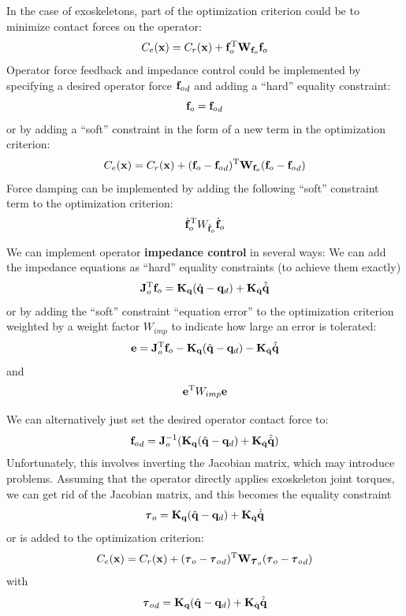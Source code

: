 \documentclass[letterpaper,12pt,fullpage]{article}
\begin{document}
In the case of exoskeletons, 
part of the optimization criterion could be to
minimize contact forces on the operator:
\begin{equation}
C_e({\bf x}) = C_r({\bf x}) + {\bf f}^{{\rm T}}_o {\bf W}_{{\bf f}_o} {\bf f}_o
\end{equation}
Operator force feedback and impedance control could be implemented by specifying a
desired operator force ${{\bf f}_o}_d$ and adding a ``hard'' equality constraint:
\begin{equation}
{\bf f}_o = {{\bf f}_o}_d
\end{equation}
or by adding a ``soft'' constraint in the form of a new term in the optimization
criterion:
\begin{equation}
C_e({\bf x}) = C_r({\bf x}) + ({\bf f}_o - {{\bf f}_o}_d)^{{\rm T}} {\bf W}_{{\bf f}_o} ({\bf f}_o - {{\bf f}_o}_d)
\end{equation}
Force damping can be implemented by adding the following ``soft'' constraint term
to the optimization criterion:
\begin{equation}
\dot{{\bf f}}_o^{{\rm T}} W_{\dot{{\bf f}}_o} \dot{{\bf f}}_o
\end{equation}

We can implement operator {\bf impedance control} in several ways:
We can add 
the impedance equations as ``hard'' equality constraints (to achieve them exactly)
\begin{equation}
{\bf J}_o^{{\rm T}} {{\bf f}_o} = {\bf K}_{{\bf q}}( \hat{{\bf q}} - {\bf q}_d ) + {\bf K}_{\dot{{\bf q}}} \hat{\dot{{\bf q}}}
\end{equation}
or by adding the ``soft'' constraint ``equation error'' to the optimization criterion
weighted by a weight factor $W_{imp}$ to indicate
how large an error is tolerated:
\begin{equation}
{\bf e} = {\bf J}_o^{{\rm T}} {{\bf f}_o} - {\bf K}_{{\bf q}}( \hat{{\bf q}} - {\bf q}_d ) - {\bf K}_{\dot{{\bf q}}} \hat{\dot{{\bf q}}}
\end{equation}
and
\begin{equation}
{\bf e}^{{\rm T}} W_{imp} {\bf e}
\end{equation}

We can alternatively just set the desired operator contact force to:
\begin{equation}
{{\bf f}_o}_d = {\bf J}_o^{-1} ( {\bf K}_{{\bf q}}( \hat{{\bf q}} - {\bf q}_d ) + {\bf K}_{\dot{{\bf q}}} \hat{\dot{{\bf q}}} )
\end{equation}
Unfortunately, this involves inverting the Jacobian matrix, which may introduce
problems.
Assuming that the operator directly applies exoskeleton joint torques, 
we can get rid of the Jacobian matrix, and this becomes
the equality constraint
\begin{equation}
\vtau_o = \mK_{\vq}( \hat{\vq} - \vq_d ) + \mK_{\dot{\vq}} \hat{\dot{\vq}}
\end{equation}
or is added to the optimization criterion:
\begin{equation}
C_e(\vx) = C_r(\vx) 
+ (\vtau_o - {\vtau_o}_d)^{\tr} \mW_{\vtau_o} (\vtau_o - {\vtau_o}_d)
\end{equation}
with
\begin{equation}
{\vtau_o}_d = \mK_{\vq}( \hat{\vq} - \vq_d ) + \mK_{\dot{\vq}} \hat{\dot{\vq}}
\end{equation}
\end{document}

